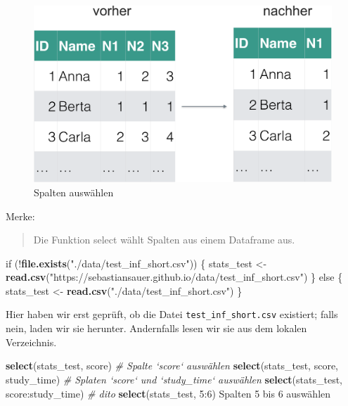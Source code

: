 \documentclass[12pt,]{book}
\newenvironment{Shaded}{\begin{snugshade}}{\end{snugshade}}
\newcommand{\KeywordTok}[1]{\textcolor[rgb]{0.13,0.29,0.53}{\textbf{{#1}}}}
\newcommand{\DecValTok}[1]{\textcolor[rgb]{0.00,0.00,0.81}{{#1}}}
\newcommand{\StringTok}[1]{\textcolor[rgb]{0.31,0.60,0.02}{{#1}}}
\newcommand{\CommentTok}[1]{\textcolor[rgb]{0.56,0.35,0.01}{\textit{{#1}}}}
\newcommand{\NormalTok}[1]{{#1}}
\begin{document}
\begin{figure}

{\centering \includegraphics[width=0.7\linewidth]{images/select} 

}

\caption{Spalten auswählen}\label{fig:fig-select}
\end{figure}

Merke:

\begin{quote}
Die Funktion select wählt Spalten aus einem Dataframe aus.
\end{quote}

\begin{Shaded}
\begin{Highlighting}[]
\NormalTok{if (!}\KeywordTok{file.exists}\NormalTok{(}\StringTok{"./data/test_inf_short.csv"}\NormalTok{)) \{}
  \NormalTok{stats_test <-}\StringTok{ }\KeywordTok{read.csv}\NormalTok{(}\StringTok{"https://sebastiansauer.github.io/data/test_inf_short.csv"}\NormalTok{) }
\NormalTok{\} else \{}
  \NormalTok{stats_test <-}\StringTok{ }\KeywordTok{read.csv}\NormalTok{(}\StringTok{"./data/test_inf_short.csv"}\NormalTok{)}
\NormalTok{\}}
\end{Highlighting}
\end{Shaded}

Hier haben wir erst geprüft, ob die Datei \texttt{test\_inf\_short.csv}
existiert; falls nein, laden wir sie herunter. Andernfalls lesen wir sie
aus dem lokalen Verzeichnis.

\begin{Shaded}
\begin{Highlighting}[]
\KeywordTok{select}\NormalTok{(stats_test, score)  }\CommentTok{# Spalte `score` auswählen}
\KeywordTok{select}\NormalTok{(stats_test, score, study_time)  }\CommentTok{# Splaten `score` und `study_time` auswählen}
\KeywordTok{select}\NormalTok{(stats_test, score:study_time) }\CommentTok{# dito}
\KeywordTok{select}\NormalTok{(stats_test, }\DecValTok{5}\NormalTok{:}\DecValTok{6}\NormalTok{) Spalten }\DecValTok{5} \NormalTok{bis }\DecValTok{6} \NormalTok{auswählen}
\end{Highlighting}
\end{Shaded}
\end{document}

